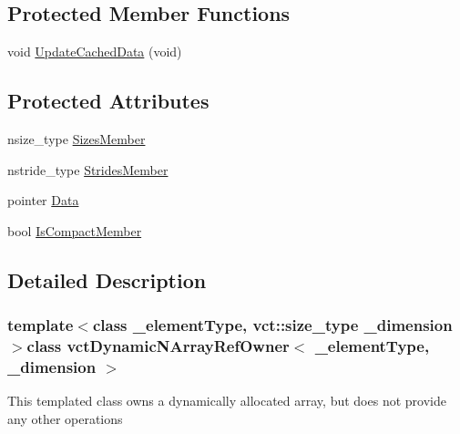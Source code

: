 \subsection*{Protected Member Functions}
\begin{DoxyCompactItemize}
\item 
void \hyperlink{classvct_dynamic_n_array_ref_owner_aaa8c0a9dacde15a25bb15e82bf1d3639}{Update\-Cached\-Data} (void)
\end{DoxyCompactItemize}
\subsection*{Protected Attributes}
\begin{DoxyCompactItemize}
\item 
nsize\-\_\-type \hyperlink{classvct_dynamic_n_array_ref_owner_af231e48b1bbeb0320c3e6cffffa1dc20}{Sizes\-Member}
\item 
nstride\-\_\-type \hyperlink{classvct_dynamic_n_array_ref_owner_a51d8276e7feb516e682465d378ae2521}{Strides\-Member}
\item 
pointer \hyperlink{classvct_dynamic_n_array_ref_owner_a11dcdd9e556492e0c6ef418b18723a04}{Data}
\item 
bool \hyperlink{classvct_dynamic_n_array_ref_owner_ab650c2c3e47f0cf87e973e35a04d9175}{Is\-Compact\-Member}
\end{DoxyCompactItemize}


\subsection{Detailed Description}
\subsubsection*{template$<$class \-\_\-element\-Type, vct\-::size\-\_\-type \-\_\-dimension$>$class vct\-Dynamic\-N\-Array\-Ref\-Owner$<$ \-\_\-element\-Type, \-\_\-dimension $>$}

This templated class owns a dynamically allocated array, but does not provide any other operations 


